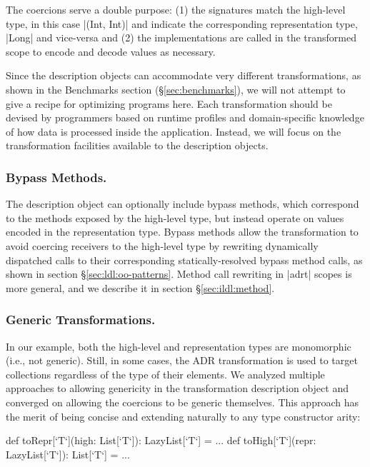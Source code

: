 The coercions serve a double purpose: (1) the signatures match the high-level type, in this case |(Int, Int)| and indicate the corresponding representation type, |Long| and vice-versa and (2) the implementations are called in the transformed scope to encode and decode values as necessary.

Since the description objects can accommodate very different transformations, as shown in the Benchmarks section (\S\ref{sec:benchmarks}), we will not attempt to give a recipe for optimizing programs here. Each transformation should be devised by programmers based on runtime profiles and domain-specific knowledge of how data is processed inside the application. Instead, we will focus on the transformation facilities available to the description objects.

\subsubsection*{Bypass Methods.} The description object can optionally include bypass methods, which correspond to the methods exposed by the high-level type, but instead operate on values encoded in the representation type. Bypass methods allow the transformation to avoid coercing receivers to the high-level type by rewriting dynamically dispatched calls to their corresponding statically-resolved bypass method calls, as shown in section \S\ref{sec:ldl:oo-patterns}. Method call rewriting in |adrt| scopes is more general, and we describe it   in section \S\ref{sec:ildl:method}.


\subsubsection*{Generic Transformations.} In our example, both the high-level and representation types are monomorphic (i.e., not generic). Still, in some cases, the ADR transformation is used to target collections regardless of the type of their elements. We analyzed multiple approaches to allowing genericity in the transformation description object and converged on allowing the coercions to be generic themselves. This approach has the merit of being concise and extending naturally to any type constructor arity:

\begin{lstlisting-nobreak}
  def toRepr[`T`](high: List[`T`]): LazyList[`T`] = ...
  def toHigh[`T`](repr: LazyList[`T`]): List[`T`] = ...
\end{lstlisting-nobreak}

